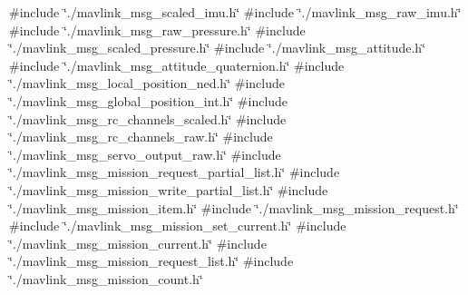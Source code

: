 {\ttfamily \#include \char`\"{}./mavlink\+\_\+msg\+\_\+scaled\+\_\+imu.\+h\char`\"{}}\newline
{\ttfamily \#include \char`\"{}./mavlink\+\_\+msg\+\_\+raw\+\_\+imu.\+h\char`\"{}}\newline
{\ttfamily \#include \char`\"{}./mavlink\+\_\+msg\+\_\+raw\+\_\+pressure.\+h\char`\"{}}\newline
{\ttfamily \#include \char`\"{}./mavlink\+\_\+msg\+\_\+scaled\+\_\+pressure.\+h\char`\"{}}\newline
{\ttfamily \#include \char`\"{}./mavlink\+\_\+msg\+\_\+attitude.\+h\char`\"{}}\newline
{\ttfamily \#include \char`\"{}./mavlink\+\_\+msg\+\_\+attitude\+\_\+quaternion.\+h\char`\"{}}\newline
{\ttfamily \#include \char`\"{}./mavlink\+\_\+msg\+\_\+local\+\_\+position\+\_\+ned.\+h\char`\"{}}\newline
{\ttfamily \#include \char`\"{}./mavlink\+\_\+msg\+\_\+global\+\_\+position\+\_\+int.\+h\char`\"{}}\newline
{\ttfamily \#include \char`\"{}./mavlink\+\_\+msg\+\_\+rc\+\_\+channels\+\_\+scaled.\+h\char`\"{}}\newline
{\ttfamily \#include \char`\"{}./mavlink\+\_\+msg\+\_\+rc\+\_\+channels\+\_\+raw.\+h\char`\"{}}\newline
{\ttfamily \#include \char`\"{}./mavlink\+\_\+msg\+\_\+servo\+\_\+output\+\_\+raw.\+h\char`\"{}}\newline
{\ttfamily \#include \char`\"{}./mavlink\+\_\+msg\+\_\+mission\+\_\+request\+\_\+partial\+\_\+list.\+h\char`\"{}}\newline
{\ttfamily \#include \char`\"{}./mavlink\+\_\+msg\+\_\+mission\+\_\+write\+\_\+partial\+\_\+list.\+h\char`\"{}}\newline
{\ttfamily \#include \char`\"{}./mavlink\+\_\+msg\+\_\+mission\+\_\+item.\+h\char`\"{}}\newline
{\ttfamily \#include \char`\"{}./mavlink\+\_\+msg\+\_\+mission\+\_\+request.\+h\char`\"{}}\newline
{\ttfamily \#include \char`\"{}./mavlink\+\_\+msg\+\_\+mission\+\_\+set\+\_\+current.\+h\char`\"{}}\newline
{\ttfamily \#include \char`\"{}./mavlink\+\_\+msg\+\_\+mission\+\_\+current.\+h\char`\"{}}\newline
{\ttfamily \#include \char`\"{}./mavlink\+\_\+msg\+\_\+mission\+\_\+request\+\_\+list.\+h\char`\"{}}\newline
{\ttfamily \#include \char`\"{}./mavlink\+\_\+msg\+\_\+mission\+\_\+count.\+h\char`\"{}}\newline

